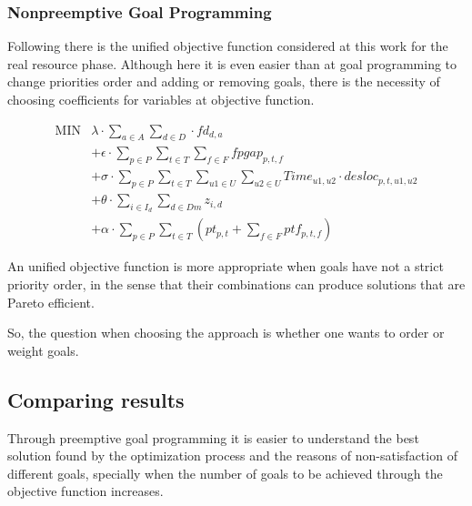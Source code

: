 



\subsubsection{Nonpreemptive Goal Programming}

Following there is the unified objective function considered at this work for the real resource phase. Although here it is even easier than at goal programming to change priorities order and adding or removing goals, there is the necessity of choosing coefficients for variables at objective function.

$$
\begin{array}{rl}
   \mbox{MIN} &
			\lambda \cdot \sum\limits_{a \in A}\sum\limits_{d \in D} \cdot fd_{d,a}
      \\
      &
      + \epsilon \cdot \sum\limits_{p \in P} \sum\limits_{t \in T} \sum\limits_{f \in F} fpgap_{p,t,f}
      \\
      &
			+ \sigma \cdot \sum\limits_{p \in P} \sum\limits_{t \in T} \sum\limits_{u1 \in U} \sum\limits_{u2 \in U} Time_{u1,u2} \cdot desloc_{p,t,u1,u2}
			\\
			&
      + \theta \cdot \sum\limits_{i \in I_{d}} \sum\limits_{d \in Dm} z_{i,d}
			\\
			&
			+ \alpha \cdot \sum\limits_{p \in P} \sum\limits_{t \in T} ( pt_{p,t} + \sum\limits_{f \in F} ptf_{p,t,f})
\end{array}
$$

An unified objective function is more appropriate when goals have not a strict priority order, in the sense that their combinations can produce solutions that are Pareto efficient.

So, the question when choosing the approach is whether one wants to order or weight goals.


\subsection{Comparing results}

Through preemptive goal programming it is easier to understand the best solution found by the optimization process and the reasons of non-satisfaction of different goals, specially when the number of goals to be achieved through the objective function increases.





